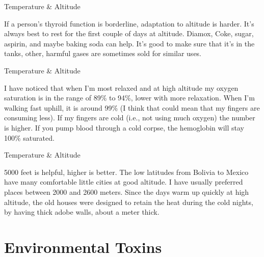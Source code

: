 \documentclass[11pt,oneside,openany,extrafontsizes]{memoir}
\begin{document}
\begin{standalonequote}{Temperature \& Altitude}

    \begin{answer}
      If a person's thyroid function is borderline, adaptation to altitude is harder. It's always best to rest for the first couple of days at altitude. Diamox, Coke, sugar, aspirin, and maybe baking soda can help. It's good to make sure that it's  in the tanks, other, harmful gases are sometimes sold for similar uses.
    \end{answer}
\end{standalonequote}

\begin{standalonequote}{Temperature \& Altitude}

    \begin{answer}
      I have noticed that when I'm most relaxed and at high altitude my oxygen saturation is in the range of 89\% to 94\%, lower with more relaxation. When I'm walking fast uphill, it is around 99\% (I think that could mean that my fingers are consuming less). If my fingers are cold (i.e., not using much oxygen) the number is higher. If you pump blood through a cold corpse, the hemoglobin will stay 100\% saturated.
    \end{answer}
\end{standalonequote}

\begin{standalonequote}{Temperature \& Altitude}

    \begin{answer}
      5000 feet is helpful, higher is better. The low latitudes from Bolivia to Mexico have many comfortable little cities at good altitude. I have usually preferred places between 2000 and 2600 meters. Since the days warm up quickly at high altitude, the old houses were designed to retain the heat during the cold nights, by having thick adobe walls, about a meter thick.
    \end{answer}
\end{standalonequote}

\section{Environmental Toxins}
\end{document}
